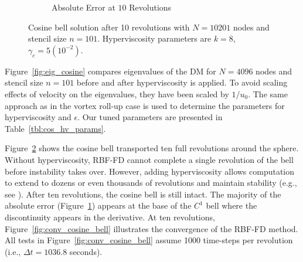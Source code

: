 \begin{figure}[ht!]
\begin{center}
\begin{subfigure}[b]{0.45\textwidth}
	\caption{Absolute Error at $10$ Revolutions}
	\label{fig:cosine_abserror}
\end{subfigure}
\caption{Cosine bell solution after 10 revolutions with $N=10201$ nodes and stencil size $n=101$.
Hyperviscosity parameters are $k = 8$, $\gamma_c = 5(10^{-2})$. 
}
 \label{fig:cosine_10revs}
\end{center}
\end{figure}

Figure~\ref{fig:eig_cosine} compares eigenvalues of the DM for $N=4096$ nodes and stencil size $n=101$ before and after hyperviscosity is applied. To avoid scaling effects of velocity on the eigenvalues, they have been scaled by $1/u_0$.  The same approach as in the vortex roll-up case is used to determine the parameters for hyperviscosity and $\epsilon$. Our tuned parameters are presented in 
Table~\ref{tbl:cos_hv_params}.


Figure~\ref{fig:cosine_10revs} shows the cosine bell transported ten full revolutions around the sphere. Without hyperviscosity, RBF-FD cannot complete a single revolution of the bell before instability takes over. However, adding hyperviscosity allows computation to extend to dozens or even thousands of revolutions and maintain stability (e.g., see \cite{FornbergLehto11}). After ten revolutions, the cosine bell is still intact. The majority of the absolute error (Figure~\ref{fig:cosine_abserror}) appears at the base of the $C^1$ bell where the discontinuity appears in the derivative. At ten revolutions, Figure~\ref{fig:conv_cosine_bell} illustrates the convergence of the RBF-FD method. All tests in Figure~\ref{fig:conv_cosine_bell} assume 1000 time-steps per revolution (i.e., $\Delta t = 1036.8$ seconds).


